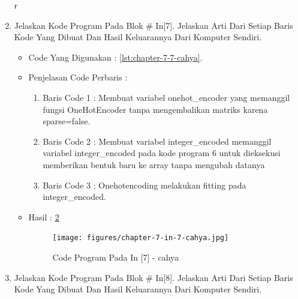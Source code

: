 \begin{enumerate}
\begin{itemize}
\begin{figure}[!hbtp]
\label{chapter-7-in-6-cahya}
\end{figure}
\end{itemize}r
\item Jelaskan Kode Program Pada Blok \# In[7]. Jelaskan Arti Dari Setiap Baris Kode Yang Dibuat Dan Hasil Keluarannya Dari Komputer Sendiri.
\begin{itemize}
\item Code Yang Digunakan : \ref{lst:chapter-7-7-cahya}.

\par
\par
\item Penjelasan Code Perbaris	: 
\begin{enumerate}
\item Baris Code 1	: Membuat variabel onehot\_encoder yang memanggil fungsi OneHotEncoder tanpa mengembalikan matriks karena sparse=false.
\item Baris Code 2	: Membuat variabel integer\_encoded memanggil variabel integer\_encoded pada kode program 6 untuk dieksekusi memberikan bentuk baru ke array tanpa mengubah datanya 
\item Baris Code 3	: Onehotencoding melakukan fitting pada integer\_encoded.
\end{enumerate}
\item Hasil : \ref{chapter-7-in-7-cahya}
\par
\par
\begin{figure}[!hbtp]
\centering
\texttt{[image: figures/chapter-7-in-7-cahya.jpg]}
\caption{Code Program Pada In [7] - cahya}
\label{chapter-7-in-7-cahya}
\end{figure}
\par
\par
\end{itemize}
\par
\par
\par
\item Jelaskan Kode Program Pada Blok \# In[8]. Jelaskan Arti Dari Setiap Baris Kode Yang Dibuat Dan Hasil Keluarannya Dari Komputer Sendiri.
\begin{itemize}
\item Code Yang Digunakan : \ref{lst:chapter-7-8-cahya}.

\par
}
\end{itemize}
\end{enumerate}
